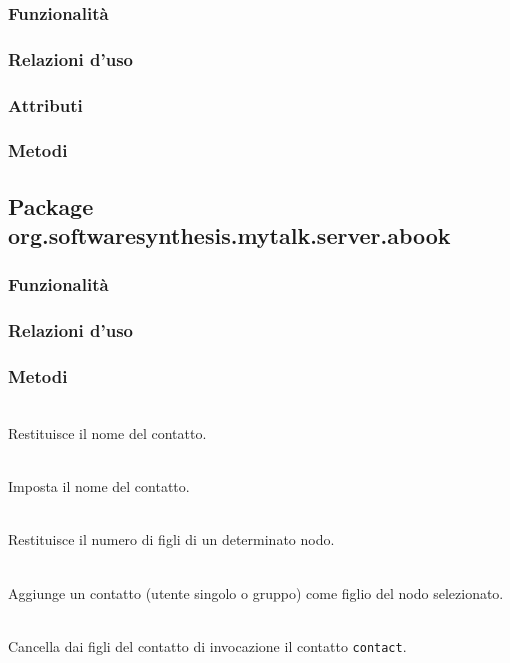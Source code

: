 \subsubsection*{Funzionalità}

\subsubsection*{Relazioni d'uso}

\subsubsection*{Attributi}

\subsubsection*{Metodi}

\subsection{Package org.softwaresynthesis.mytalk.server.abook}\label{sec:abook}


\subsubsection*{Funzionalità}

\subsubsection*{Relazioni d'uso}

\subsubsection*{Metodi}
\begin{description}
  \item{}\\
Restituisce il nome del contatto.
  \item{}\\
Imposta il nome del contatto.
  \item{}\\
Restituisce il numero di figli di un determinato nodo.
  \item{}\\
Aggiunge un contatto (utente singolo o gruppo) come figlio del nodo selezionato.
  \item{}\\
Cancella dai figli del contatto di invocazione il contatto \texttt{contact}.
\end{description}

